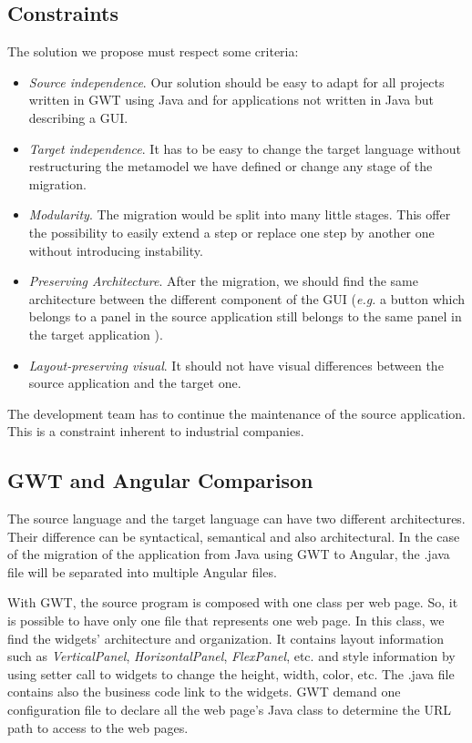 \documentclass[conference]{IEEEtran}
\begin{document}
    \subsection{Constraints}
    
    The solution we propose must respect some criteria:
    \begin{itemize}
        \item \emph{Source independence}. Our solution should be easy to adapt
            for all projects written in GWT using Java and for
            applications not written in Java but describing a GUI.
        \item \emph{Target independence}. It has to be easy to change the target
            language without restructuring the metamodel we have defined or 
            change any stage of the migration.
        \item \emph{Modularity}. The migration would be split into many little
            stages. This offer the possibility to easily extend a step or 
            replace one step by another one without introducing instability. 
        \item \emph{Preserving Architecture}. After the migration, we should find
            the same architecture between the different component of the GUI (\emph{e.g.}
            a button which belongs to a panel in the source application still belongs to the same panel in the target application ).
        \item \emph{Layout-preserving visual}. It should not have visual differences
            between the source application and the target one.
    \end{itemize}
    
    The development team has to continue the maintenance of the source application.
    This is a constraint inherent to industrial companies.
    
    \subsection{GWT and Angular Comparison}
    The source language and the target language can have two different architectures.
    Their difference can be syntactical, semantical and also architectural. %
    In the case of the migration of the application from Java using GWT to Angular, 
        the .java file will be separated into multiple Angular files.
    
    With GWT, the source program is composed with one class per web page.
    So, it is possible to have only one file that represents one web page.
    In this class, we find the widgets' architecture and organization.
    It contains layout information such as \textit{VerticalPanel}, \textit{HorizontalPanel}, \textit{FlexPanel}, etc.
        and style information by using setter call to widgets to change the height, width, color, etc.
    The .java file contains also the business code link to the widgets.
    GWT demand one configuration file to declare all the web page's Java class to
        determine the URL path to access to the web pages.
    
\end{document}
